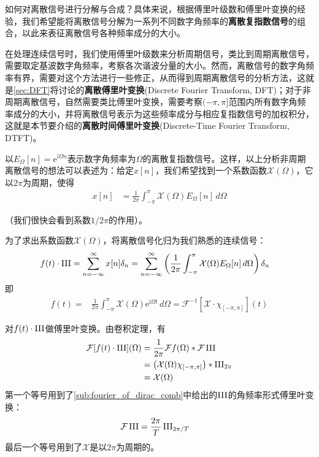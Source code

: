 如何对离散信号进行分解与合成？具体来说，根据傅里叶级数和傅里叶变换的经验，我们希望能将离散信号分解为一系列不同数字角频率的\textbf{离散复指数信号}的组合，以此来表征离散信号各种频率成分的大小。

在处理连续信号时，我们使用傅里叶级数来分析周期信号，类比到周期离散信号，需要取定基波数字角频率，考察各次谐波分量的大小。然而，离散信号的数字角频率有界，需要对这个方法进行一些修正，从而得到周期离散信号的分析方法，这就是\ref{sec:DFT}将讨论的\textbf{离散傅里叶变换}(Discrete Fourier Transform, DFT)；对于非周期离散信号，自然需要类比傅里叶变换，需要考察$(-\pi,\pi]$范围内所有数字角频率成分的大小，并将离散信号表示为这些频率成分与相应复指数信号的加权积分，这就是本节要介绍的\textbf{离散时间傅里叶变换}(Discrete-Time Fourier Transform, DTFT)。

以$E_{\Omega}[n]=\mathrm{e}^{\mathrm{i}\Omega n}$表示数字角频率为$\Omega$的离散复指数信号。这样，以上分析非周期离散信号的想法可以表述为：给定$x[n]$，我们希望找到一个系数函数$\mathcal{X} (\Omega)$，它以$2\pi$为周期，使得\begin{align*}
    x[n]&=\frac{1}{2\pi}\int_{-\pi}^{\pi}\mathcal{X} (\Omega)E_{\Omega}[n]\,d\Omega
\end{align*}

（我们很快会看到系数$1/2\pi$的作用）。

为了求出系数函数$\mathcal{X} (\Omega)$，将离散信号化归为我们熟悉的连续信号：
\begin{align*}
    f(t)\cdot\operatorname{III}&=\sum_{n=-\infty}^{\infty}x[n]\delta_{n}=\sum_{n=-\infty}^{\infty}\left(\frac{1}{2\pi}\int_{-\pi}^{\pi}\mathcal{X} (\Omega)E_{\Omega}[n]\,d\Omega\right)\delta_{n}
\end{align*}
即\begin{align*}
    f(t)=&\frac{1}{2\pi}\int_{-\pi}^{\pi}\mathcal{X} (\Omega)\mathrm{e}^{\mathrm{i}\Omega t}\,d\Omega=\mathcal{F} ^{-1}[\mathcal{X}\cdot\chi_{[-\pi,\pi]}](t)
\end{align*}

对$f(t)\cdot\operatorname{III}$做傅里叶变换。由卷积定理，有
\begin{align*}
    \mathcal{F} [f(t)\cdot\operatorname{III}](\Omega)&=\frac{1}{2\pi}\mathcal{F} f(\Omega)*\mathcal{F} \operatorname{III}\\
    &=\left(\mathcal{X} (\Omega)\chi_{[-\pi,\pi]}\right)*\operatorname{III}_{2\pi}\\
    &=\mathcal{X} (\Omega)
\end{align*}
第一个等号用到了\ref{sub:fourier_of_dirac_comb}中给出的$\operatorname{III}$的角频率形式傅里叶变换：
{\color{red}\begin{align*}
    \mathcal{F} \operatorname{III}&=\frac{2\pi}{T}\operatorname{III}_{2\pi/T}
\end{align*}}
最后一个等号用到了$\mathcal{X} $是以$2\pi$为周期的。

